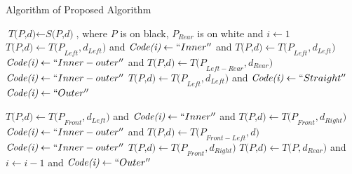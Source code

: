 \begin{algorithm}
	\caption{Algorithm of Proposed Algorithm}
	\label{alg:proposed}
	\begin{algorithmic}[1]
	\State $\textit{T(P,d)} \gets \textit{S(P,d)}$, where $P$ is on black, $P_{Rear}$ is on white and $i \gets 1$
	\Do
			\State $\textit{T(P,d)} \gets \textit{T(P}_{Left},\textit{d}_{Left} )  $ and $\textit{Code(i)} \gets ``Inner''$ and $\textit{T(P,d)} \gets \textit{T(P}_{Left}, \textit{d}_{Left})$
		\Else
			\State $\textit{Code(i)} \gets ``Inner-outer''$ and $\textit{T(P,d)} \gets \textit{T(P}_{Left-Rear},\textit{d}_{Rear} )  $
			\State $\textit{Code(i)} \gets ``Inner-outer''$
		\EndIf
	\Else
			\State $\textit{T(P,d)} \gets \textit{T(P}_{Left},\textit{d}_{Left} )  $ and $\textit{Code(i)} \gets ``Straight''$
		\Else
			\State $\textit{Code(i)} \gets ``Outer''$
		\EndIf
	\EndIf


			\State $\textit{T(P,d)} \gets \textit{T(P}_{Front},\textit{d}_{Left} )  $ and $\textit{Code(i)} \gets ``Inner''$ and $\textit{T(P,d)} \gets \textit{T(P}_{Front}, \textit{d}_{Right})$
		\Else
			\State $\textit{Code(i)} \gets ``Inner-outer''$ and $\textit{T(P,d)} \gets \textit{T(P}_{Front-Left},\textit{d} )  $
			\State $\textit{Code(i)} \gets ``Inner-outer''$
		\EndIf
		\State $\textit{T(P,d)} \gets \textit{T(P}_{Front},\textit{d}_{Right} )  $
	\Else
		\State $\textit{T(P,d)} \gets \textit{T(P},\textit{d}_{Rear} )  $ and $i \gets i-1$ and $\textit{Code(i)} \gets ``Outer''$
	\EndIf


	\EndProcedure
	\end{algorithmic}
\end{algorithm}


